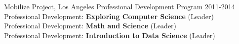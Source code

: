 \begin{reSubsection}{Mobilize Project, Los Angeles }{ Professional Development Program }{2011-2014}{
 Professional Development: \textbf{Exploring Computer Science} (Leader) \\
  Professional Development: \textbf{Math and Science} (Leader) \\
Professional Development: \textbf{Introduction to Data Science} (Leader) \\
}
\end{reSubsection}


%

